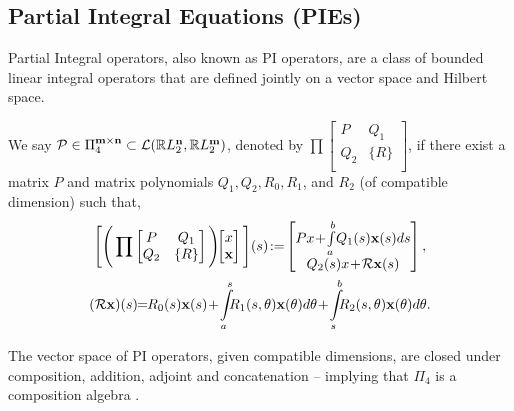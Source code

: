 \subsection{Partial Integral Equations (PIEs)}
Partial Integral operators, also known as PI operators, are a class of bounded linear integral operators that are defined jointly on a vector space and Hilbert space.
\begin{definition}
	We say $\mathcal{P} \in {\Pi}_4^{\mathbf{m}\times\mathbf{n}} \subset \mathcal{L}(\mathbb{R} L_2^{\mathbf{n}}, \mathbb{R} L_2^{\mathbf{m}})$, denoted by $\prod \begin{bmatrix}
			P   & Q_1   \\
			Q_2 & \{R\} \\
		\end{bmatrix}$, if there exist a matrix $P$ and matrix polynomials $Q_1, Q_2, R_0, R_1$, and $R_2$ (of compatible dimension) such that,
	\begin{gather*}
		\Bigg[\Bigg(\prod \begin{bmatrix}
				P   & Q_1   \\
				Q_2 & \{R\} \\
			\end{bmatrix}\Bigg)\! \! \bmat{x \\ \mbf{x}}\Bigg](s)\! :=\! \bmat{Px\! +\!\int\limits_a^b\!Q_1(s)\mbf x(s)ds\\Q_2(s)x\!+\!\mcl R \mbf x(s)},\\
		(\mcl R \mbf x)(s)\!\! =\!\! R_0(s)\mbf x(s)\! +\! \int\limits_a^s\!\!\!R_1(s,\theta)\mbf x(\theta)d\theta\! +\!\int\limits_s^b\!\!\!R_2(s,\theta)\mbf x(\theta) d\theta.
	\end{gather*}

\end{definition}
The vector space of PI operators, given compatible dimensions, are closed under composition, addition, adjoint and concatenation -- implying that ${\Pi}_4$ is a composition algebra \cite{shivakumar2024GDPE}.


